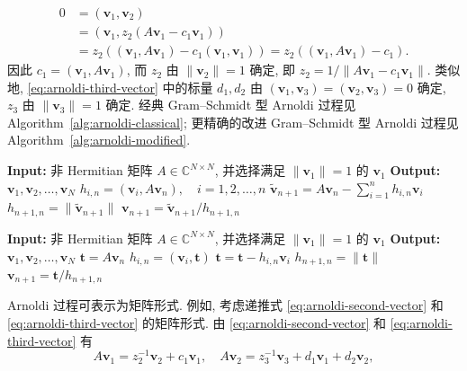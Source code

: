 \[
\begin{aligned}
0&=(\bm v_1,\bm v_2)\\
&=(\bm v_1,z_2(A\bm v_1-c_1\bm v_1))\\
&=z_2((\bm v_1,A\bm v_1)-c_1(\bm v_1,\bm v_1))=z_2((\bm v_1,A\bm v_1)-c_1).
\end{aligned}
\]
{因此 $c_1=(\bm v_1,A\bm v_1)$, 而 $z_2$ 由 $\|\bm v_2\|=1$ 确定, 即 $z_2=1/\|A\bm v_1-c_1\bm v_1\|$. 类似地, \eqref{eq:arnoldi-third-vector} 中的标量 $d_1,d_2$ 由 $(\bm v_1,\bm v_3)=(\bm v_2,\bm v_3)=0$ 确定, $z_3$ 由 $\|\bm v_3\|=1$ 确定.}
{经典 Gram--Schmidt 型 Arnoldi 过程见 Algorithm~\ref{alg:arnoldi-classical}; 更精确的改进 Gram--Schmidt 型 Arnoldi 过程见 Algorithm~\ref{alg:arnoldi-modified}.}
\begin{algorithm}[H]\caption{{经典 Gram--Schmidt 型 Arnoldi 过程}}\label{alg:arnoldi-classical}
\begin{algorithmic}[1]
\Statex\textbf{Input:} {非 Hermitian 矩阵 $A\in\mathbb C^{N\times N}$, 并选择满足 $\|\bm v_1\|=1$ 的 $\bm v_1$}
\Statex\textbf{Output:} $\bm v_1,\bm v_2,\ldots,\bm v_N$
\State $h_{i,n}=(\bm v_i,A\bm v_n),\quad i=1,2,\ldots,n$
\State $\tilde{\bm v}_{n+1}=A\bm v_n-\sum_{i=1}^n h_{i,n}\bm v_i$
\State $h_{n+1,n}=\|\tilde{\bm v}_{n+1}\|$
\State $\bm v_{n+1}=\tilde{\bm v}_{n+1}/h_{n+1,n}$
\EndFor
\end{algorithmic}\end{algorithm}
\begin{algorithm}[H]\caption{{改进 Gram--Schmidt 型 Arnoldi 过程}}\label{alg:arnoldi-modified}
\begin{algorithmic}[1]
\Statex\textbf{Input:} {非 Hermitian 矩阵 $A\in\mathbb C^{N\times N}$, 并选择满足 $\|\bm v_1\|=1$ 的 $\bm v_1$}
\Statex\textbf{Output:} $\bm v_1,\bm v_2,\ldots,\bm v_N$
\State $\bm t=A\bm v_n$
\State $h_{i,n}=(\bm v_i,\bm t)$
\State $\bm t=\bm t-h_{i,n}\bm v_i$
\EndFor
\State $h_{n+1,n}=\|\bm t\|$
\State $\bm v_{n+1}=\bm t/h_{n+1,n}$
\EndFor
\end{algorithmic}\end{algorithm}
{Arnoldi 过程可表示为矩阵形式. 例如, 考虑递推式 \eqref{eq:arnoldi-second-vector} 和 \eqref{eq:arnoldi-third-vector} 的矩阵形式. 由 \eqref{eq:arnoldi-second-vector} 和 \eqref{eq:arnoldi-third-vector} 有}
\[A\bm v_1=z_2^{-1}\bm v_2+c_1\bm v_1,\quad
A\bm v_2=z_3^{-1}\bm v_3+d_1\bm v_1+d_2\bm v_2,\]

